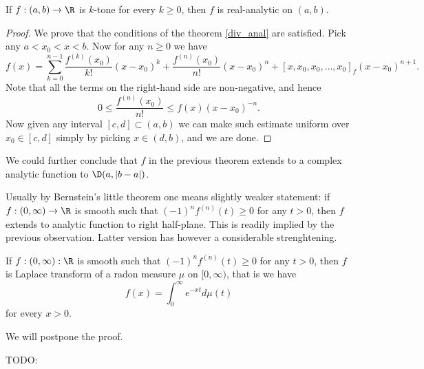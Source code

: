 \begin{lause}
	If $f : (a, b) \to \R$ is $k$-tone for every $k \geq 0$, then $f$ is real-analytic on $(a, b)$.
\end{lause}
\begin{proof}
	We prove that the conditions of the theorem \ref{div_anal} are satisfied. Pick any $a < x_{0} < x < b$. Now for any $n \geq 0$ we have
	\[
		f(x) = \sum_{k = 0}^{n - 1} \frac{f^{(k)}(x_{0})}{k!}(x - x_{0})^{k} + \frac{f^{(n)}(x_{0})}{n!} (x - x_{0})^{n} + [x, x_{0}, x_{0}, \ldots, x_{0}]_{f} (x - x_{0})^{n + 1}.
	\]
	Note that all the terms on the right-hand side are non-negative, and hence
	\[
		0 \leq \frac{f^{(n)}(x_{0})}{n!} \leq f(x) (x - x_{0})^{-n}.
	\]
	Now given any interval $[c, d] \subset (a, b)$ we can make such estimate uniform over $x_{0} \in [c, d]$ simply by picking $x \in (d, b)$, and we are done.
\end{proof}

We could further conclude that $f$ in the previous theorem extends to a complex analytic function to $\D(a, |b - a|)$.

Usually by Bernstein's little theorem one means slightly weaker statement: if $f : (0, \infty) \to \R$ is smooth such that $(-1)^{n} f^{(n)}(t) \geq 0$ for any $t > 0$, then $f$ extends to analytic function to right half-plane. This is readily implied by the previous observation. Latter version has however a considerable strenghtening.

\begin{lause}
	If $f : (0, \infty) : \R$ is smooth such that $(-1)^{n} f^{(n)}(t) \geq 0$ for any $t > 0$, then $f$ is Laplace transform of a radon measure $\mu$ on $[0, \infty)$, that is we have
	\[
		f(x) = \int_{0}^{\infty} e^{-x t} d \mu(t)
	\]
	for every $x > 0$.
\end{lause}

We will postpone the proof.

TODO:

